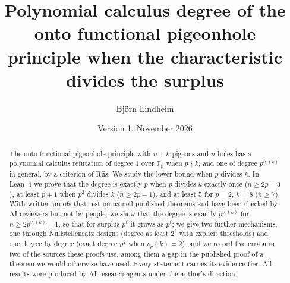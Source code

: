 \documentclass[11pt]{article}
\title{Polynomial calculus degree of the onto functional pigeonhole principle
when the characteristic divides the surplus}
\author{Bj\"orn Lindheim}
\date{Version 1, November 2026}
\theoremstyle{definition}
\theoremstyle{remark}
\begin{document}
\maketitle

\begin{abstract}
The onto functional pigeonhole principle with $n+k$ pigeons and $n$ holes has a polynomial
calculus refutation of degree $1$ over $\mathbb F_p$ when $p\nmid k$, and one of degree
$p^{v_p(k)}$ in general, by a criterion of Riis.  We study the lower bound when $p$ divides
$k$.  In Lean~4 we prove that the degree is exactly $p$ when $p$ divides $k$ exactly once
($n\ge2p-3$), at least $p+1$ when $p^2$ divides $k$ ($n\ge2p-1$), and at least $5$ for $p=2$,
$k=8$ ($n\ge7$).  With written proofs that rest on named published theorems and have been
checked by AI reviewers but not by people, we show that the degree is exactly $p^{v_p(k)}$
for $n\ge2p^{v_p(k)}-1$, so that for surplus $p^\ell$ it grows as $p^\ell$; we give two
further mechanisms, one through Nullstellensatz designs (degree at least $2^\ell$ with
explicit thresholds) and one degree by degree (exact degree $p^2$ when $v_p(k)=2$); and we
record five errata in two of the sources these proofs use, among them a gap in the published
proof of a theorem we would otherwise have used.  Every statement carries its
evidence tier.  All results were produced by AI research agents under the author's direction.
\end{abstract}











\appendix




\end{document}
